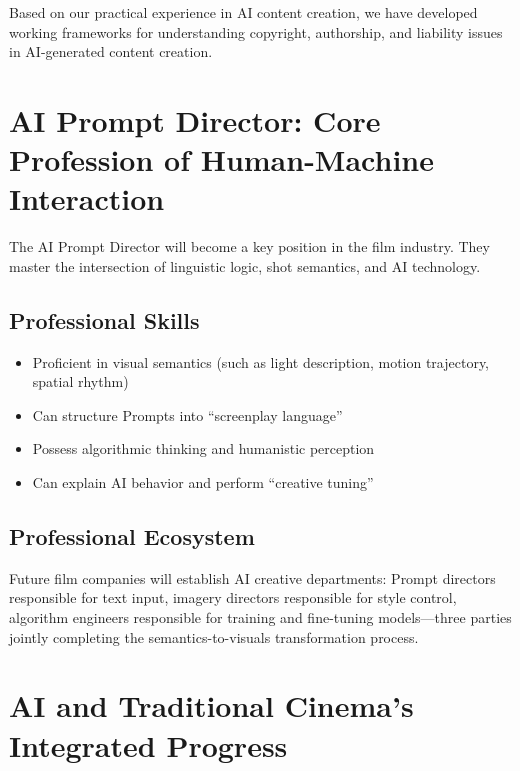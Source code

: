 Based on our practical experience in AI content creation, we have developed working frameworks for understanding copyright, authorship, and liability issues in AI-generated content creation.

\section{AI Prompt Director: Core Profession of Human-Machine Interaction}
\label{sec:ai-Prompt-director}

The AI Prompt Director will become a key position in the film industry. They master the intersection of linguistic logic, shot semantics, and AI technology.

\subsection{Professional Skills}

\begin{itemize}
\item Proficient in visual semantics (such as light description, motion trajectory, spatial rhythm)
\item Can structure Prompts into ``screenplay language''
\item Possess algorithmic thinking and humanistic perception
\item Can explain AI behavior and perform ``creative tuning''
\end{itemize}

\subsection{Professional Ecosystem}

Future film companies will establish AI creative departments: Prompt directors responsible for text input, imagery directors responsible for style control, algorithm engineers responsible for training and fine-tuning models—three parties jointly completing the semantics-to-visuals transformation process.

\section{AI and Traditional Cinema's Integrated Progress}
\label{sec:ai-traditional-fusion}

